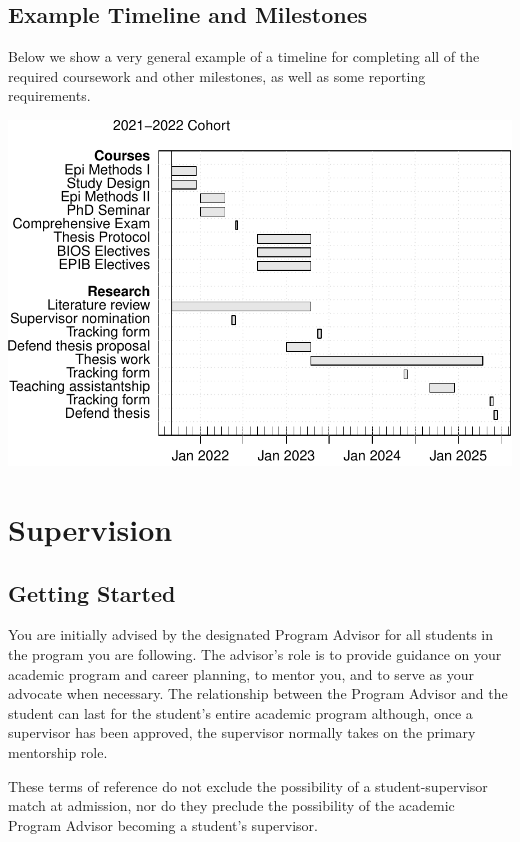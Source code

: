 \documentclass[
  openany]{book}
\begin{document}
\hypertarget{example-timeline-and-milestones}{%
\section{Example Timeline and Milestones}\label{example-timeline-and-milestones}}

Below we show a very general example of a timeline for completing all of the required coursework and other milestones, as well as some reporting requirements.

\includegraphics{01-Introduction_files/figure-latex/plan-1.pdf}

\hypertarget{supervision}{%
\chapter{Supervision}\label{supervision}}

\hypertarget{getting-started}{%
\section{Getting Started}\label{getting-started}}

You are initially advised by the designated Program Advisor for all students in the program you are following. The advisor's role is to provide guidance on your academic program and career planning, to mentor you, and to serve as your advocate when necessary. The relationship between the Program Advisor and the student can last for the student's entire academic program although, once a supervisor has been approved, the supervisor normally takes on the primary mentorship role.

These terms of reference do not exclude the possibility of a student-supervisor match at admission, nor do they preclude the possibility of the academic Program Advisor becoming a student's supervisor.
\end{document}
